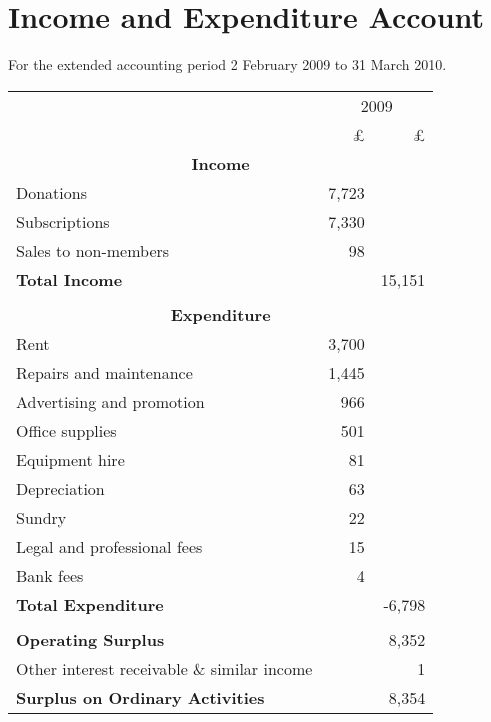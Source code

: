 \section{Income and Expenditure Account}
For the extended accounting period 2 February 2009 to 31 March 2010.

\begin{center}
\begin{tabular}{ l  r  r }
\toprule
            & \multicolumn{2}{c}{2009} \\
\cmidrule(r){2-3}
                            & £     & £     \\
\multicolumn{3}{c}{{\bf Income}}              \\
Donations                   & 7,723 &       \\
Subscriptions               & 7,330 &       \\
Sales to non-members        & 98    &       \\
{\bf Total Income}            &       & 15,151 \\ \cmidrule{2-3} \\
\multicolumn{3}{c}{{\bf Expenditure}}              \\
Rent                        & 3,700 &   \\
Repairs and maintenance     & 1,445 &   \\
Advertising and promotion   & 966   &   \\
Office supplies             & 501   &   \\
Equipment hire              & 81    &   \\
Depreciation                & 63    &   \\
Sundry                      & 22    &   \\
Legal and professional fees & 15    &   \\
Bank fees                 & 4     &   \\
{\bf Total Expenditure}     &       & -6,798 \\ \cmidrule{2-3} \\
{\bf Operating Surplus}     &       & 8,352 \\
Other interest receivable \& similar income   & &   1 \\
{\bf Surplus on Ordinary Activities} &  & 8,354 \\
\bottomrule
\end{tabular}
\end{center}
\pagebreak
